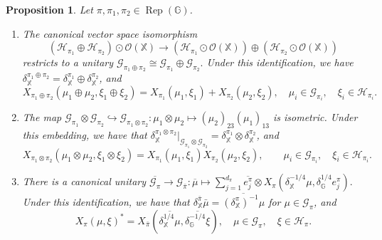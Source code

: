\documentclass[reqno]{amsart}
\numberwithin{equation}{section}
\newtheorem{Prop}[Theorem]{Proposition}
\DeclareMathOperator{\Rep}{\mathrm{Rep}}
\newcommand{\mcG}{\mathcal{G}}
\newcommand{\mcH}{\mathcal{H}}
\newcommand{\mcO}{\mathcal{O}}
\newcommand{\G}{\mathbb{G}}
\newcommand{\X}{\mathbb{X}}
\begin{document}
\begin{Prop}\label{1}
    Let $\pi, \pi_1, \pi_2 \in \Rep(\G)$.
    \begin{enumerate}
        \item The canonical vector space isomorphism
    $$(\mathcal{H}_{\pi_1}\oplus\mathcal{H}_{\pi_2})\odot \mcO(\X)\to (\mathcal{H}_{\pi_1}\odot \mcO(\X))\oplus (\mathcal{H}_{\pi_2}\odot \mcO(\X))$$ restricts to a unitary
    $\mathcal{G}_{\pi_1\oplus \pi_2}\cong \mathcal{G}_{\pi_1}\oplus \mathcal{G}_{\pi_2}.$ Under this identification, we have $\delta_\X^{\pi_1\oplus \pi_2}= \delta_\X^{\pi_1}\oplus \delta_{\X}^{\pi_2}$, and
    $$X_{\pi_1\oplus \pi_2}(\mu_1\oplus \mu_2, \xi_1 \oplus \xi_2) = X_{\pi_1}(\mu_1, \xi_1)+ X_{\pi_2}(\mu_2, \xi_2), \quad \mu_i \in \mcG_{\pi_i}, \quad \xi_i \in \mcH_{\pi_i}.$$
    \item The map
    $\mathcal{G}_{\pi_1}\otimes \mathcal{G}_{\pi_2}\hookrightarrow \mathcal{G}_{\pi_1\otimes \pi_2}: \mu_1 \otimes \mu_2 \mapsto (\mu_{2})_{23}(\mu_1)_{13}$ is isometric. Under this embedding, we have that $\delta_{\X}^{\pi_1\otimes \pi_2}\vert_{\mcG_{\pi_1}\otimes \mcG_{\pi_2}}= \delta_\X^{\pi_1}\otimes \delta_\X^{\pi_2}$, and  
    $$X_{\pi_1\otimes \pi_2}(\mu_1\otimes \mu_2, \xi_1 \otimes \xi_2) = X_{\pi_1}(\mu_1, \xi_1)X_{\pi_2}(\mu_2, \xi_2), \quad \quad \mu_i \in \mcG_{\pi_i}, \quad \xi_i \in \mcH_{\pi_i}.$$
    \item There is a canonical unitary
    $ \overline{\mathcal{G}_\pi}\to \mathcal{G}_{\bar{\pi}}: \overline{\mu} \mapsto \sum_{j=1}^{d_\pi}\overline{e_j^\pi}\otimes X_\pi(\delta_\X^{-1/4}\mu, \delta_\G^{1/4}e_j^\pi).$
    Under this identification, we have that $\delta^{\bar{\pi}}_\X \bar{\mu}= \overline{(\delta_\X^{\pi})^{-1} \mu}$ for $\mu \in \mcG_\pi$, and 
    $$X_\pi(\mu, \xi)^* = X_{\bar{\pi}}(\overline{\delta^{1/4}_\X\mu}, \overline{\delta_\G^{-1/4}\xi}), \quad \mu \in \mcG_\pi, \quad \xi \in \mcH_\pi.$$
    \end{enumerate}
\end{Prop}
\end{document}
